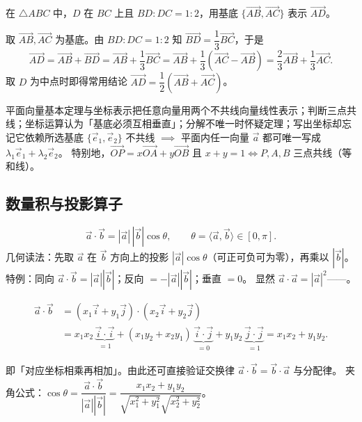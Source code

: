 \begin{explore}
\begin{example}
在 $\triangle ABC$ 中，$D$ 在 $BC$ 上且 $BD:DC=1:2$，用基底 $\{\overrightarrow{AB},\overrightarrow{AC}\}$ 表示 $\overrightarrow{AD}$。
\end{example}
\begin{solution}
取 $\overrightarrow{AB},\overrightarrow{AC}$ 为基底。由 $BD:DC=1:2$ 知 $\overrightarrow{BD}=\dfrac13\overrightarrow{BC}$，于是
\[
  \overrightarrow{AD}=\overrightarrow{AB}+\overrightarrow{BD}
  =\overrightarrow{AB}+\frac13\overrightarrow{BC}
  =\overrightarrow{AB}+\frac13(\overrightarrow{AC}-\overrightarrow{AB})
  =\frac23\overrightarrow{AB}+\frac13\overrightarrow{AC}.
\]
取 $D$ 为中点时即得常用结论 $\overrightarrow{AD}=\dfrac12(\overrightarrow{AB}+\overrightarrow{AC})$。
\end{solution}

\begin{conccard}[一级]{平面向量基本定理与坐标表示}{把任意向量用两个不共线向量线性表示；判断三点共线；坐标运算}{认为「基底必须互相垂直」；分解不唯一时怀疑定理；写出坐标却忘记它依赖所选基底}
$\{\vec e_1,\vec e_2\}$ 不共线 $\implies$ 平面内任一向量 $\vec a$ 都可唯一写成 $\lambda_1\vec e_1+\lambda_2\vec e_2$。
特别地，$\overrightarrow{OP}=x\overrightarrow{OA}+y\overrightarrow{OB}$ 且 $x+y=1\iff P,A,B$ 三点共线（等和线）。
\end{conccard}

\subsection{数量积与投影算子}


\[
  \vec a\cdot\vec b=|\vec a|\,|\vec b|\cos\theta,\qquad \theta=\langle\vec a,\vec b\rangle\in[0,\pi].
\]
几何读法：先取 $\vec a$ 在 $\vec b$ 方向上的投影 $|\vec a|\cos\theta$（可正可负可为零），再乘以 $|\vec b|$。
特例：同向 $\vec a\cdot\vec b=|\vec a||\vec b|$；反向 $=-|\vec a||\vec b|$；垂直 $=0$。
显然 $\vec a\cdot\vec a=|\vec a|^2$——。

\begin{derivation}
\begin{align*}
  \vec a\cdot\vec b
  &=(x_1\vec i+y_1\vec j)\cdot(x_2\vec i+y_2\vec j)\\
  &=x_1x_2\,\underbrace{\vec i\cdot\vec i}_{=1}
    +(x_1y_2+x_2y_1)\,\underbrace{\vec i\cdot\vec j}_{=0}
    +y_1y_2\,\underbrace{\vec j\cdot\vec j}_{=1}
  =x_1x_2+y_1y_2.
\end{align*}
\end{derivation}
即「对应坐标相乘再相加」。由此还可直接验证交换律 $\vec a\cdot\vec b=\vec b\cdot\vec a$ 与分配律。
夹角公式：$\cos\theta=\dfrac{\vec a\cdot\vec b}{|\vec a||\vec b|}=\dfrac{x_1x_2+y_1y_2}{\sqrt{x_1^2+y_1^2}\sqrt{x_2^2+y_2^2}}$。


\end{explore}
